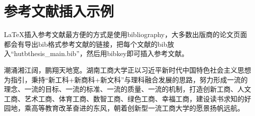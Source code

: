 \section{参考文献插入示例}

LaTeX\cite{lamport1994latex}插入参考文献最方便的方式是使用bibliography\cite{pritchard1969statistical}，大多数出版商的论文页面\cite{lamport1994latex,pritchard1969statistical}都会有导出bib格式参考文献的链接，把每个文献的bib放入``hutbthesis\_main.bib''，然后用bibkey即可插入参考文献。

潮涌湘江阔，鹏翔天地宽。湖南工商大学正以习近平新时代中国特色社会主义思想为指引，秉持“新工科+新商科+新文科”与理科融合发展的思路，努力形成一流的理念、一流的目标、一流的标准、一流的质量、一流的机制，打造创新工商、人文工商、艺术工商、体育工商、数智工商、绿色工商、幸福工商，建设读书求知的好园地，乘高等教育改革奋进的东风，朝着创新型一流工商大学的愿景扬帆远航。

